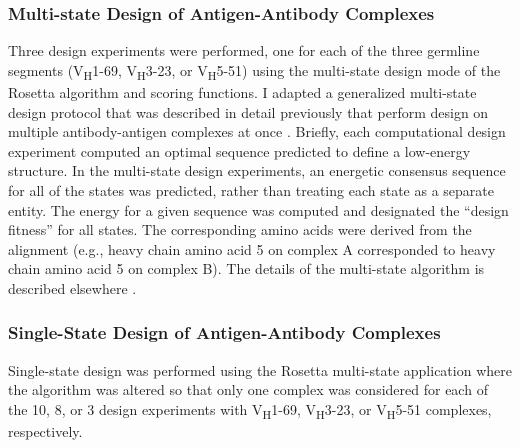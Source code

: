 \subsubsection{Multi-state Design of Antigen-Antibody Complexes}
Three design experiments were performed, one for each of the three germline segments (V\textsubscript{H}1-69, V\textsubscript{H}3-23, or V\textsubscript{H}5-51) using the multi-state design mode of the Rosetta algorithm and scoring functions. I adapted a generalized multi-state design protocol that was described in detail previously that perform design on multiple antibody-antigen complexes at once \citep{LeaverFay:2011ji}. Briefly, each computational design experiment computed an optimal sequence predicted to define a low-energy structure.  In the multi-state design experiments, an energetic consensus sequence for all of the states was predicted, rather than treating each state as a separate entity. The energy for a given sequence was computed and designated the ``design fitness'' for all states. The corresponding amino acids were derived from the alignment (e.g., heavy chain amino acid 5 on complex A corresponded to heavy chain amino acid 5 on complex B). The details of the multi-state algorithm is described elsewhere \citep{LeaverFay:2011ji}.

\subsubsection{Single-State Design of Antigen-Antibody Complexes}
Single-state design was performed using the Rosetta multi-state application where the algorithm was altered so that only one complex was considered for each of the 10, 8, or 3 design experiments with V\textsubscript{H}1-69, V\textsubscript{H}3-23, or V\textsubscript{H}5-51 complexes, respectively.


